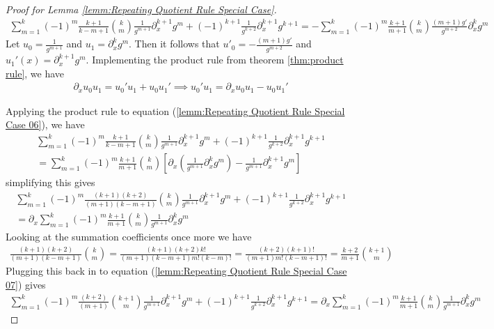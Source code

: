 \begin{proof}[Proof for Lemma \ref{lemm:Repeating Quotient Rule Special Case}]
\begin{align}
\sum_{m=1}^{k}(-1)^m\frac{k+1}{k-m+1}\binom{k}{m}\frac{1}{g^{m+1}}\partial_x^{k+1}g^m + (-1)^{k+1}\frac{1}{g^{k+2}}\partial_x^{k+1}g^{k+1} = -\sum_{m=1}^{k}(-1)^m\frac{k+1}{m+1}\binom{k}{m}\frac{(m+1)g'}{g^{m+2}}\partial_x^{k}g^m  \label{lemm:Repeating Quotient Rule Special Case 06}
\end{align}
Let $u_0 = \frac{1}{g^{m+1}}$ and $u_1 = \partial_x^{k}g^m$. Then it follows that $u'_0 = -\frac{(m+1)g'}{g^{m+2}}$ and $u_1'(x) = \partial_x^{k+1}g^m$. Implementing the product rule from theorem \ref{thm:product rule}, we have
\begin{align}
\partial_x u_0u_1 = u_0'u_1 + u_0u_1' \implies
u_0'u_1 = \partial_x u_0u_1 - u_0u_1'
\end{align}

Applying the product rule to equation (\ref{lemm:Repeating Quotient Rule Special Case 06}), we have
\begin{align}
\sum_{m=1}^{k}(-1)^m\frac{k+1}{k-m+1}\binom{k}{m}\frac{1}{g^{m+1}}\partial_x^{k+1}g^m + (-1)^{k+1}\frac{1}{g^{k+2}}\partial_x^{k+1}g^{k+1} \\ = \sum_{m=1}^{k}(-1)^m\frac{k+1}{m+1}\binom{k}{m}\left[\partial_x\left(\frac{1}{g^{m+1}}\partial_x^{k}g^m\right) - \frac{1}{g^{m+1}}\partial_x^{k+1}g^m\right]
\end{align}
simplifying this gives
\begin{align}
\sum_{m=1}^{k}(-1)^m\frac{(k+1)(k+2)}{(m+1)(k-m+1)}\binom{k}{m}\frac{1}{g^{m+1}}\partial_x^{k+1}g^m + (-1)^{k+1}\frac{1}{g^{k+2}}\partial_x^{k+1}g^{k+1} \\ = \partial_x\sum_{m=1}^{k}(-1)^m\frac{k+1}{m+1}\binom{k}{m}\frac{1}{g^{m+1}}\partial_x^{k}g^m \label{lemm:Repeating Quotient Rule Special Case 07}
\end{align}
Looking at the summation coefficients once more we have
\begin{align}
\frac{(k+1)(k+2)}{(m+1)(k-m+1)}\binom{k}{m} = \frac{(k+1)(k+2)k!}{(m+1)(k-m+1)m!(k-m)!} = \frac{(k+2)(k+1)!}{(m+1)m!(k-m+1)!} = \frac{k+2}{m+1}\binom{k+1}{m}
\end{align}
Plugging this back in to equation (\ref{lemm:Repeating Quotient Rule Special Case 07}) gives
\begin{align}
\sum_{m=1}^{k}(-1)^m\frac{(k+2)}{(m+1)}\binom{k+1}{m}\frac{1}{g^{m+1}}\partial_x^{k+1}g^m + (-1)^{k+1}\frac{1}{g^{k+2}}\partial_x^{k+1}g^{k+1}  = \partial_x\sum_{m=1}^{k}(-1)^m\frac{k+1}{m+1}\binom{k}{m}\frac{1}{g^{m+1}}\partial_x^{k}g^m
\end{align}

\end{proof}
